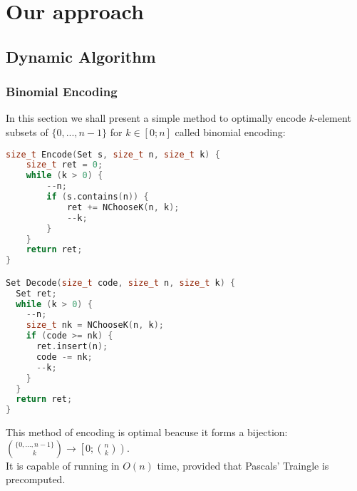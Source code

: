 \section{Our approach}
\subsection{Dynamic Algorithm}
\subsubsection{Binomial Encoding \cite{binomial_encoding}}
In this section we shall present a simple method to optimally encode $k$-element subsets of $\{0,...,n-1\}$ for $k\in\left[0;n\right]$ called binomial encoding:
\begin{lstlisting}[language=C++]
size_t Encode(Set s, size_t n, size_t k) {
	size_t ret = 0;
	while (k > 0) {
		--n;
		if (s.contains(n)) {
			ret += NChooseK(n, k);
			--k;
		}
	}
	return ret;
}

Set Decode(size_t code, size_t n, size_t k) {
  Set ret;
  while (k > 0) {
    --n;
    size_t nk = NChooseK(n, k);
    if (code >= nk) {
      ret.insert(n);
      code -= nk;
      --k;
    }
  }
  return ret;
}
\end{lstlisting}
This method of encoding is optimal beacuse it forms a bijection: $\binom{\{0,...,n-1\}}{k}\rightarrow\left[0; \binom{n}{k}\right)$.\\
It is capable of running in $O(n)$ time, provided that Pascals' Traingle is precomputed.
